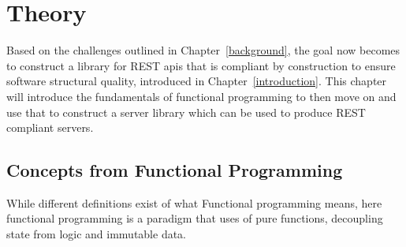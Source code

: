 \chapter{Theory}\label{theory} 

Based on the challenges outlined in Chapter~\ref{background}, the goal now
becomes to construct a library for REST apis that is compliant by construction
to ensure software structural quality, introduced in Chapter~\ref{introduction}.
This chapter will introduce the fundamentals of functional programming to then
move on and use that to construct a server library which can be used to produce
REST compliant servers.

\section{Concepts from Functional Programming}\label{functionalprogramming}

 While different definitions exist of what Functional programming means, here 
 functional programming is a paradigm that uses of pure functions,
 decoupling state from logic and immutable data.

